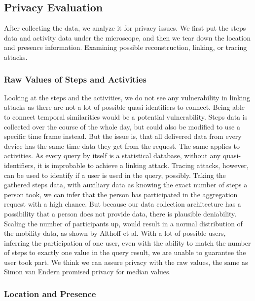 \subsection{Privacy Evaluation}
After collecting the data, we analyze it for privacy issues. We first put the steps data and activity data under the microscope, and then we tear down the location and presence information. Examining possible reconstruction, linking, or tracing attacks.

\subsubsection{Raw Values of Steps and Activities}
Looking at the steps and the activities, we do not see any vulnerability in linking attacks as there are not a lot of possible quasi-identifiers to connect. Being able to connect temporal similarities would be a potential vulnerability. Steps data is collected over the course of the whole day, but could also be modified to use a specific time frame instead. But the issue is, that all delivered data from every device has the same time data they get from the request. The same applies to activities. As every query by itself is a statistical database, without any quasi-identifiers, it is improbable to achieve a linking attack. 
Tracing attacks, however, can be used to identify if a user is used in the query, possibly. Taking the gathered steps data, with auxiliary data as knowing the exact number of steps a person took, we can infer that the person has participated in the aggregation request with a high chance. But because our data collection architecture has a possibility that a person does not provide data, there is plausible deniability. Scaling the number of participants up, would result in a normal distribution of the mobility data, as shown by Althoff et al. With a lot of possible users, inferring the participation of one user, even with the ability to match the number of steps to exactly one value in the query result, we are unable to guarantee the user took part. We think we can assure privacy with the raw values, the same as Simon van Endern promised privacy for median values.

\subsubsection{Location and Presence}

